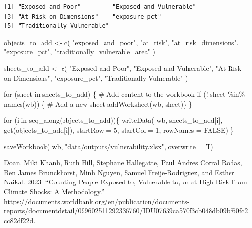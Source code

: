 \documentclass[
  letterpaper,
  DIV=11,
  numbers=noendperiod]{scrartcl}
\newenvironment{Shaded}{}{}
\newcommand{\AttributeTok}[1]{\textcolor[rgb]{0.84,0.23,0.29}{#1}}
\newcommand{\CommentTok}[1]{\textcolor[rgb]{0.42,0.45,0.49}{#1}}
\newcommand{\ConstantTok}[1]{\textcolor[rgb]{0.00,0.36,0.77}{#1}}
\newcommand{\ControlFlowTok}[1]{\textcolor[rgb]{0.84,0.23,0.29}{#1}}
\newcommand{\DecValTok}[1]{\textcolor[rgb]{0.00,0.36,0.77}{#1}}
\newcommand{\FunctionTok}[1]{\textcolor[rgb]{0.44,0.26,0.76}{#1}}
\newcommand{\NormalTok}[1]{\textcolor[rgb]{0.14,0.16,0.18}{#1}}
\newcommand{\OtherTok}[1]{\textcolor[rgb]{0.44,0.26,0.76}{#1}}
\newcommand{\SpecialCharTok}[1]{\textcolor[rgb]{0.00,0.36,0.77}{#1}}
\newcommand{\StringTok}[1]{\textcolor[rgb]{0.01,0.18,0.38}{#1}}
\newlength{\cslhangindent}
\newenvironment{CSLReferences}[2] %
 {\begin{list}{}{%
  \setlength{\itemindent}{0pt}
  \setlength{\leftmargin}{0pt}
  \setlength{\parsep}{0pt}
  \ifodd #1
   \setlength{\leftmargin}{\cslhangindent}
   \setlength{\itemindent}{-1\cslhangindent}
  \fi
  \setlength{\itemsep}{#2\baselineskip}}}
 {\end{list}}
\begin{document}
\begin{verbatim}
[1] "Exposed and Poor"         "Exposed and Vulnerable"  
[3] "At Risk on Dimensions"    "exposure_pct"            
[5] "Traditionally Vulnerable"
\end{verbatim}

\begin{Shaded}
\begin{Highlighting}[]
\NormalTok{objects\_to\_add }\OtherTok{\textless{}{-}} \FunctionTok{c}\NormalTok{(}
  \StringTok{"exposed\_and\_poor"}\NormalTok{,}
  \StringTok{"at\_risk"}\NormalTok{,}
  \StringTok{"at\_risk\_dimensions"}\NormalTok{,}
  \StringTok{"exposure\_pct"}\NormalTok{,}
  \StringTok{"traditionally\_vulnerable\_area"}
\NormalTok{)}

\NormalTok{sheets\_to\_add }\OtherTok{\textless{}{-}} \FunctionTok{c}\NormalTok{(}
  \StringTok{"Exposed and Poor"}\NormalTok{, }
  \StringTok{"Exposed and Vulnerable"}\NormalTok{, }
  \StringTok{"At Risk on Dimensions"}\NormalTok{,}
  \StringTok{"exposure\_pct"}\NormalTok{,}
  \StringTok{"Traditionally Vulnerable"}
\NormalTok{  )}

\ControlFlowTok{for}\NormalTok{ (sheet }\ControlFlowTok{in}\NormalTok{ sheets\_to\_add) \{}
  \CommentTok{\# Add content to the workbook}
  \ControlFlowTok{if}\NormalTok{ (}\SpecialCharTok{!}\NormalTok{ sheet }\SpecialCharTok{\%in\%} \FunctionTok{names}\NormalTok{(wb)) \{}
  \CommentTok{\# Add a new sheet}
  \FunctionTok{addWorksheet}\NormalTok{(wb, sheet)\}}
\NormalTok{\}}

\ControlFlowTok{for}\NormalTok{ (i }\ControlFlowTok{in} \FunctionTok{seq\_along}\NormalTok{(objects\_to\_add))\{}
  \FunctionTok{writeData}\NormalTok{(}
\NormalTok{  wb,}
\NormalTok{  sheets\_to\_add[i], }
  \FunctionTok{get}\NormalTok{(objects\_to\_add[i]), }
  \AttributeTok{startRow =} \DecValTok{5}\NormalTok{, }
  \AttributeTok{startCol =} \DecValTok{1}\NormalTok{, }
  \AttributeTok{rowNames =} \ConstantTok{FALSE}\NormalTok{)}
\NormalTok{\}}

\FunctionTok{saveWorkbook}\NormalTok{(}
\NormalTok{  wb,}
  \StringTok{"data/outputs/vulnerability.xlsx"}\NormalTok{,}
  \AttributeTok{overwrite =}\NormalTok{ T)}
\end{Highlighting}
\end{Shaded}

\label{refs}
\begin{CSLReferences}{1}{0}
Doan, Miki Khanh, Ruth Hill, Stephane Hallegatte, Paul Andres Corral
Rodas, Ben James Brunckhorst, Minh Nguyen, Samuel Freije-Rodriguez, and
Esther Naikal. 2023. {``Counting People Exposed to, Vulnerable to, or at
High Risk From Climate Shocks: A Methodology.''}
\url{https://documents.worldbank.org/en/publication/documents-reports/documentdetail/099602511292336760/IDU07639ca570f3cb048db09bf60fc2cc82df22d}.

\end{CSLReferences}
\end{document}
